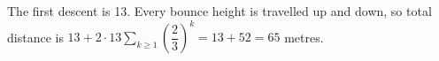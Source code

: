 The first descent is 13. Every bounce height is travelled up and down, so total distance is $13+2\cdot13\sum_{k\ge1}(\dfrac{2}{3})^k=13+52=\boxed{65}$ metres.
